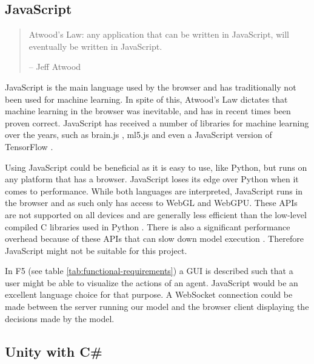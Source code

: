 \subsection{JavaScript}
\begin{quote}
    Atwood's Law: any application that can be written in JavaScript, will eventually be written in JavaScript.
    
    -- Jeff Atwood \cite{AtwoodsLaw}
\end{quote}

JavaScript is the main language used by the browser and has traditionally not been used for machine learning. In spite of this, Atwood's Law \cite{AtwoodsLaw} dictates
that machine learning in the browser was inevitable, and has in recent times been proven correct. JavaScript has received a number of libraries
for machine learning over the years, such as brain.js \cite{BrainJS}, ml5.js \cite{ML5JS} and even a JavaScript version of TensorFlow \cite{TensorFlowJS}.

Using JavaScript could be beneficial as it is easy to use, like Python, but runs on any platform that has a browser. JavaScript loses its edge over Python
when it comes to performance. While both languages are interpreted, JavaScript runs in the browser and as such only has access to WebGL and WebGPU. 
These APIs are not supported on all devices and are generally less efficient than the low-level compiled C libraries used in Python \cite{WebGPUvsCUDA}.
There is also a significant performance overhead because of these APIs that can slow down model execution \cite{DeepLearningInBrowsers}. Therefore JavaScript
might not be suitable for this project.

In F5 (see table \ref{tab:functional-requirements}) a GUI is described such that a user might be able to visualize the actions of an agent. JavaScript would be an 
excellent language choice for that purpose. A WebSocket connection could be made between the server running our model and the browser client displaying
the decisions made by the model.

\subsection{Unity with C\#}
